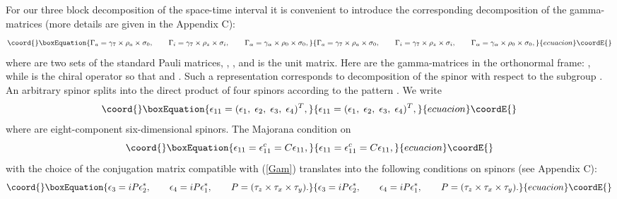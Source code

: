 \documentclass[a4paper,12pt]{article}
\begin{document}
For our three block decomposition of the space-time interval it
is convenient to introduce the corresponding \coordHE{}
decomposition of the gamma-matrices (more details are given in
the Appendix C):
\begin{equation}\coord{}\boxEquation{
\Gamma_a = \gamma_7 \times \rho_a \times \sigma_0, \qquad
\Gamma_i = \gamma_7 \times \rho_z \times \sigma_i, \qquad
\Gamma_\alpha = \gamma_\alpha \times \rho_0 \times \sigma_0,
\label{Gam}
}{
\Gamma_a = \gamma_7 \times \rho_a \times \sigma_0, \qquad
\Gamma_i = \gamma_7 \times \rho_z \times \sigma_i, \qquad
\Gamma_\alpha = \gamma_\alpha \times \rho_0 \times \sigma_0,
}{ecuacion}\coordE{}\end{equation}
where \coordHE{} are two sets of the standard \coordHE{}
Pauli matrices, \coordHE{}, \coordHE{}, \coordHE{} and \coordHE{} is
the unit matrix. Here \myHighlight{$\gamma_\alpha$}\coordHE{} are the \coordHE{} gamma-matrices
in the orthonormal frame: \myHighlight{$\{\gamma_\alpha,\gamma_\beta\}=
2\eta_{\alpha\beta}$}\coordHE{}, while \coordHE{} is the chiral operator
\coordHE{}
so that \coordHE{} and \coordHE{}.
Such a representation corresponds to decomposition of the
\coordHE{} spinor with respect to the subgroup \coordHE{}. An arbitrary \coordHE{} spinor \coordHE{}
splits into the direct product of four \coordHE{} spinors according to
the pattern \coordHE{}. We write
\begin{equation}\coord{}\boxEquation{\label{SPi}
\epsilon_{11}=(\epsilon_1,\; \epsilon_2,\; \epsilon_3,\;
\epsilon_4)^T,
}{\epsilon_{11}=(\epsilon_1,\; \epsilon_2,\; \epsilon_3,\;
\epsilon_4)^T,
}{ecuacion}\coordE{}\end{equation}
where \coordHE{} are
eight-component six-dimensional spinors. The Majorana condition
on \coordHE{}
\begin{equation}\coord{}\boxEquation{\label{11MA}
\epsilon_{11} = \epsilon_{11}^c = C  \epsilon_{11},
}{\epsilon_{11} = \epsilon_{11}^c = C  \epsilon_{11},
}{ecuacion}\coordE{}\end{equation}
with the choice of the conjugation matrix \coordHE{} compatible with
(\ref{Gam}) translates into the following conditions on \coordHE{}
spinors (see Appendix C):
\begin{equation}\coord{}\boxEquation{\label{MAJ}
\epsilon_3 = i P \epsilon_2^*, \qquad \epsilon_4 = i P
\epsilon_1^*, \qquad P=(\tau_z \times \tau_x \times \tau_y).
}{\epsilon_3 = i P \epsilon_2^*, \qquad \epsilon_4 = i P
\epsilon_1^*, \qquad P=(\tau_z \times \tau_x \times \tau_y).
}{ecuacion}\coordE{}\end{equation}
\end{document}
